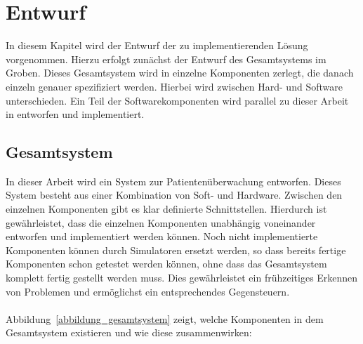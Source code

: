 

\chapter{Entwurf}\label{Entwurf}

In diesem Kapitel wird der Entwurf der zu implementierenden Lösung vorgenommen. Hierzu erfolgt zunächst der Entwurf des Gesamtsystems
im Groben. Dieses Gesamtsystem wird in einzelne Komponenten zerlegt, die danach einzeln genauer spezifiziert werden.
Hierbei wird zwischen Hard- und Software unterschieden. Ein Teil der Softwarekomponenten wird parallel zu dieser 
Arbeit in \cite{Jan} entworfen und implementiert.

\section{Gesamtsystem}
In dieser Arbeit wird ein System zur Patientenüberwachung entworfen. Dieses System besteht aus einer Kombination
von Soft- und Hardware. Zwischen den einzelnen Komponenten gibt es klar definierte Schnittstellen. Hierdurch ist
gewährleistet, dass die einzelnen Komponenten unabhängig voneinander entworfen und implementiert werden können. Noch nicht
implementierte Komponenten können durch Simulatoren ersetzt werden, so dass bereits fertige Komponenten schon getestet
werden können, ohne dass das Gesamtsystem komplett fertig gestellt werden muss. Dies gewährleistet ein frühzeitiges
Erkennen von Problemen und ermöglichst ein entsprechendes Gegensteuern.\\
\\
Abbildung~\ref{abbildung_gesamtsystem} zeigt, welche Komponenten in dem Gesamtsystem existieren und wie diese
zusammenwirken:

